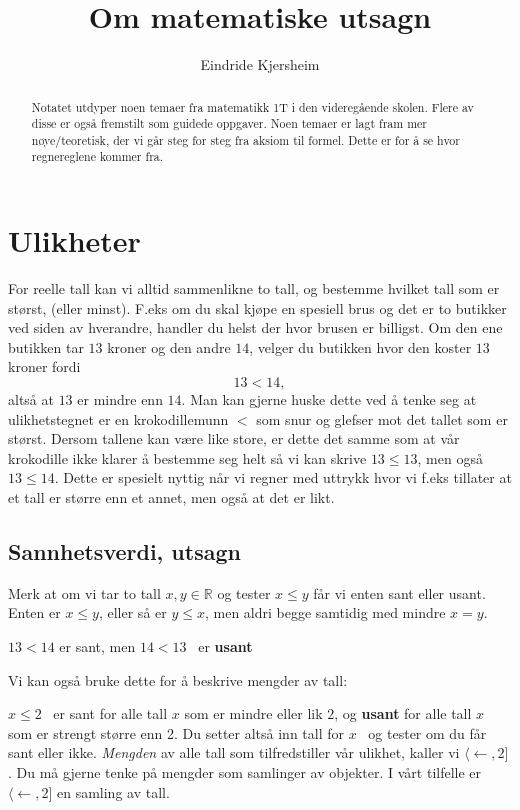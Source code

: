 \documentclass[11pt]{article}
\title{Om matematiske utsagn}
\author{Eindride Kjersheim}
\theoremstyle{definition}
\theoremstyle{definition}
\newcommand{\R}{\mathbb{R}}
\def\la{\langle}
\begin{document}
\maketitle

\begin{abstract}
Notatet utdyper noen temaer fra matematikk 1T i den videregående skolen.
Flere av disse er også fremstilt som guidede oppgaver. Noen temaer er lagt fram mer
nøye/teoretisk, der vi går steg for steg fra aksiom til formel. Dette er
for å se hvor regnereglene kommer fra.
\end{abstract}

\section{Ulikheter}
For reelle tall kan vi alltid sammenlikne to tall, og bestemme
hvilket tall som er størst, (eller minst). F.eks om du skal kjøpe
en spesiell brus og det er to butikker ved siden av hverandre,
   handler du helst der hvor brusen er billigst. Om den ene butikken
   tar $13$ kroner og den andre $14$, velger du butikken hvor den koster
   $13$ kroner fordi 
   \[13 < 14,\] 
   altså at $13$ er mindre enn $14$.
   Man kan gjerne huske dette ved å tenke seg at ulikhetstegnet er
   en krokodillemunn $<$ som snur og glefser mot det tallet som er størst.
   Dersom tallene kan være like store, er dette det samme som at vår krokodille
   ikke klarer å
   bestemme seg helt så vi kan skrive $13\leq 13$, men også
   $13 \leq 14$. Dette er spesielt nyttig når vi regner med uttrykk
   hvor vi f.eks tillater at et tall er større enn et annet, men også
   at det er likt.
\subsection{Sannhetsverdi, utsagn}
Merk at om vi tar to tall $x, y \in \R$ og tester $x \leq y$ får
vi enten sant eller usant. Enten er $x \leq y$, eller så er
$y \leq x$, men aldri begge samtidig med mindre $x = y$.
\begin{eksempel}
$13 < 14$ er sant, men $14 < 13$  er \textbf{usant}
\end{eksempel}

Vi kan også bruke dette for å beskrive mengder av tall:

\begin{eksempel}
$x\leq 2$  er sant for alle tall $x$ som er mindre eller lik $2$,
    og \textbf{usant} for alle tall $x$ som er strengt større enn 2.
Du setter altså inn tall for $x$  og tester om du får sant eller ikke.
\emph{Mengden} av alle tall som tilfredstiller vår ulikhet, kaller vi
$\la \leftarrow, 2]$. Du må gjerne tenke på mengder som samlinger av
objekter. I vårt tilfelle er $\la \leftarrow, 2]$ en samling av tall.
\end{eksempel}
\end{document}
